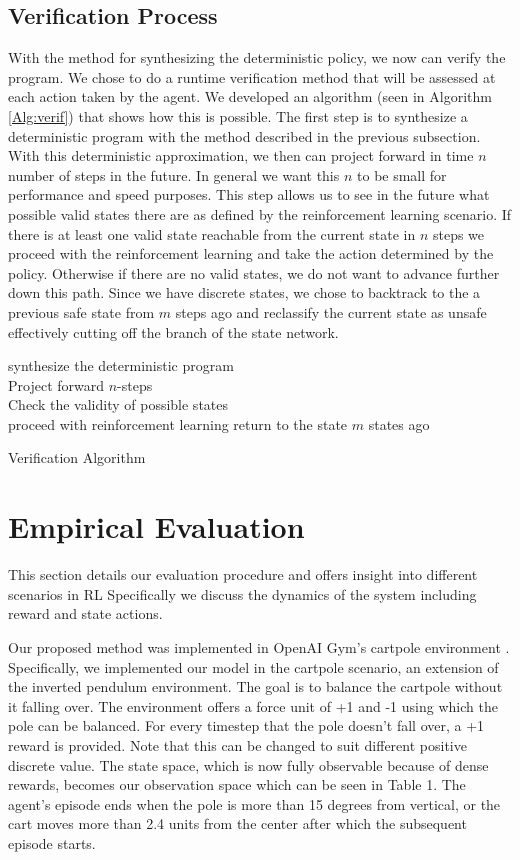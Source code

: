 \documentclass[acmsmall,review,authorversion]{acmart}
\begin{document}
\subsection{Verification Process}
With the method for synthesizing the deterministic policy, we now can verify the program. We chose to do a runtime verification method that will be assessed at each action taken by the agent. We developed an algorithm (seen in Algorithm \ref{Alg:verif}) that shows how this is possible. The first step is to synthesize a deterministic program with the method described in the previous subsection. With this deterministic approximation, we then can project forward in time $n$ number of steps in the future. In general we want this $n$ to be small for performance and speed purposes. This step allows us to see in the future what possible valid states there are as defined by the reinforcement learning scenario. If there is at least one valid state reachable from the current state in $n$ steps we proceed with the reinforcement learning and take the action determined by the policy. Otherwise if there are no valid states, we do not want to advance further down this path. Since we have discrete states, we chose to backtrack to the a previous safe state from $m$ steps ago and reclassify the current state as unsafe effectively cutting off the branch of the state network.
\begin{algorithm}[ht]
    synthesize the deterministic program\\
    Project forward $n$-steps\\
    Check the validity of possible states \\
      {
        proceed with reinforcement learning
      }
      {
        return to the state $m$ states ago
      }
 \caption{Verification Algorithm}
 \label{Alg:verif}
\end{algorithm}{}
\section{Empirical Evaluation}
This section details our evaluation procedure and offers insight into different scenarios in RL Specifically we discuss the dynamics of the system including reward and state actions.

Our proposed method was implemented in OpenAI Gym's cartpole environment \cite{DBLP:journals/corr/BrockmanCPSSTZ16}. Specifically, we implemented our model in the cartpole scenario, an extension of the inverted pendulum environment. The goal is to balance the cartpole without it falling over. The environment offers a force unit of +1 and -1 using which the pole can be balanced. For every timestep that the pole doesn't fall over, a +1 reward is provided. Note that this can be changed to suit different positive discrete value. The state space, which is now fully observable because of dense rewards, becomes our observation space which can be seen in Table 1. The agent's episode ends when the pole is more than 15 degrees from vertical, or the cart moves more than 2.4 units from the center after which the subsequent episode starts. 
\end{document}
